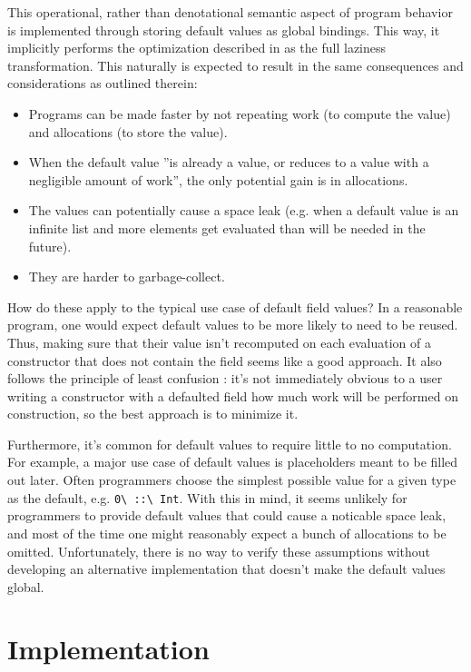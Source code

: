 \documentclass[en]{pracamgr}
\newcommand{\code}[1]{\lstinline[breaklines=true]{#1}}
\begin{document}
This operational, rather than denotational semantic aspect of program behavior is implemented through
storing default values as global bindings.
This way, it implicitly performs the optimization
described in \cite{partain1996let-floating} as the full laziness transformation. 
This naturally is expected to result in the same consequences and considerations as outlined therein:
\begin{itemize}
  \item Programs can be made faster by not repeating work (to compute the value) and allocations (to store the value).
  \item When the default value ''is already a value, or reduces to a value with a negligible amount of work'', the only potential gain is in allocations.
  \item The values can potentially cause a space leak 
    (e.g. when a default value is an infinite list and more elements get evaluated than will be needed in the future).
  \item They are harder to garbage-collect.
\end{itemize}
How do these apply to the typical use case of default field values?
In a reasonable program, one would expect default values to be more likely to need to be reused.
Thus, making sure that their value isn't recomputed on each evaluation of a constructor that does not contain the field seems like a good approach.
It also follows the principle of least confusion \cite{saltzer2009principles}: 
it's not immediately obvious to a user writing a constructor with a defaulted field how much work will be performed on construction,
so the best approach is to minimize it.

Furthermore, it's common for default values to require little to no computation. 
For example, a major use case of default values is placeholders meant to be filled out later. 
Often programmers choose the simplest possible value for a given type as the default, e.g. \code{0\ ::\ Int}.
With this in mind, it seems unlikely for programmers to provide default values that could cause a noticable space leak, and most of the time one might
reasonably expect a bunch of allocations to be omitted.
Unfortunately, there is no way to verify these assumptions without developing an alternative implementation that doesn't make the default values global.


\chapter{Implementation}\label{ch:impl}
\end{document}
